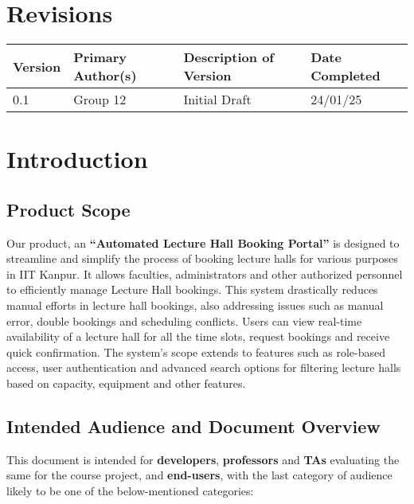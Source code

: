 \documentclass[a4paper,12pt]{article}
\begin{document}
\section*{Revisions}
\begin{tabular}{|l|l|l|l|}
\hline
\textbf{Version} & \textbf{Primary Author(s)} & \textbf{Description of Version} & \textbf{Date Completed} \\
\hline
0.1 & Group 12 & Initial Draft & 24/01/25 \\
\hline
\end{tabular}
\newpage

\section{Introduction} \label{sec:intro}
\subsection{Product Scope} \label{subsec:product_scope}
Our product, an \textbf{``Automated Lecture Hall Booking Portal''} is designed to streamline and simplify the process of booking lecture halls for various purposes in IIT Kanpur. It allows faculties, administrators and other authorized personnel to efficiently manage Lecture Hall bookings. This system drastically reduces manual efforts in lecture hall bookings, also addressing issues such as manual error, double bookings and scheduling conflicts. Users can view real-time availability of a lecture hall for all the time slots, request bookings and receive quick confirmation.
 The system's scope extends to features such as role-based access, user authentication and advanced search options for filtering lecture halls based on capacity, equipment and other features.


\subsection{Intended Audience and Document Overview} \label{subsec:intended_audience}
This document is intended for \textbf{developers}, \textbf{professors} and \textbf{TAs} evaluating the same for the course project, and \textbf{end-users}, with the last category of audience likely to be one of the below-mentioned categories:
\end{document}
